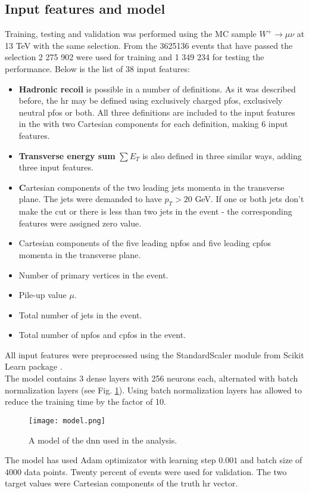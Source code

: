 \subsection{Input features and model}
 Training, testing and validation was performed using the MC sample $W^+\rightarrow\mu\nu$ at 13 TeV with the same selection. From the 3625136 events that have passed the selection 2 275 902 were used for training and 1 349 234 for testing the performance. 
 Below is the list of 38 input features: 
 \begin{itemize}
 \item \textbf{Hadronic recoil} is possible in a number of definitions. As it was described before, the \gls{hr} may be defined using exclusively charged \gls{pfos}, exclusively neutral \gls{pfos} or both. All three definitions are included to the input features in the with two Cartesian components for each definition, making 6 input features. 
 \item \textbf{Transverse energy sum} $\sum E_T$ is also defined in three similar ways, adding three input features.
 \item \textbf Cartesian components of the {two leading jets} momenta in the transverse plane. The jets were demanded to have $p_T>20$ GeV. If one or both jets don't make the cut or there is less than two jets in the event - the corresponding features were assigned zero value. 
 \item Cartesian components of the {five leading \gls{npfos} and five leading \gls{cpfos}} momenta in the transverse plane. 
 \item Number of primary vertices in the event.
 \item Pile-up value $\mu$.
 \item Total number of jets in the event.
 \item Total number of \gls{npfos} and \gls{cpfos} in the event.
\end{itemize}
All input features were preprocessed using the StandardScaler module from Scikit Learn package \cite{scikit-learn}.\\
The model contains 3 dense layers with 256 neurons each, alternated with batch normalization layers (see Fig. \ref{fig::nnmodel}). Using batch normalization layers has allowed to reduce the training time by the factor of 10. 
\begin{figure}[htpb]
	\centering
	\texttt{[image: model.png]}
	\caption{A model of the \gls{dnn} used in the analysis. }
	\label{fig::nnmodel}
\end{figure}
The model has used Adam optimizator with learning step $0.001$ and batch size of $4000$ data points. Twenty percent of events were used for validation. The two target values were Cartesian components of the truth \gls{hr} vector.
 
